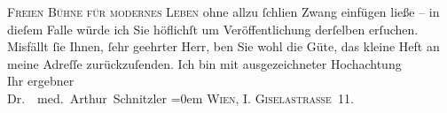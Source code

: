 \begin{ledgroupsized}[t]{13cm}
                  \textsc{Freien Bühne für modernes Leben} ohne allzu ſchli{\geminationm}en Zwang einfügen ließe – in
               dieſem Falle würde ich Sie höflichſt um Veröffentlichung derſelben erſuchen. Misfällt
               ſie Ihnen, ſehr geehrter Herr, {\pb}ben Sie wohl die Güte, das kleine Heft an meine Adreſſe zurückzuſenden.\pend
           \pstart
           Ich bin mit ausgezeichneter Hochachtung{\\[\baselineskip]}Ihr ergebner{\\[\baselineskip]}\spacefill\mbox{Dr.  med. Arthur Schnitzler}\pend
           \leftskip=0em{}\pstart
           \noindent{}\textsc{Wien, I. Giselastraße 11.}\pend
           \endnumbering{}\end{ledgroupsized}  \newcommand{\dateiname}{L00005}\newcommand{\titel}{Arthur Schnitzler an Wilhelm Bölsche, [Anfang September] 1890}\newcommand{\editorInnen}{Martin Anton Müller und Gerd-Hermann Susen}
      